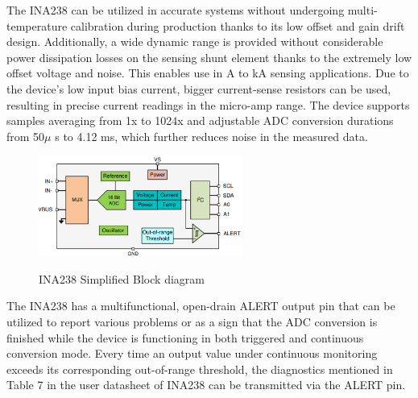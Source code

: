 The INA238 can be utilized in accurate systems without undergoing multi-temperature calibration during production thanks to its low offset and gain drift design. Additionally, a wide dynamic range is provided without considerable power dissipation losses on the sensing shunt element thanks to the extremely low offset voltage and noise. This enables use in A to kA sensing applications. Due to the device's low input bias current, bigger current-sense resistors can be used, resulting in precise current readings in the micro-amp range.
The device supports samples averaging from 1x to 1024x and adjustable ADC conversion durations from 50$\mu$ s to 4.12 ms, which further reduces noise in the measured data.

\begin{figure}[h]
	\centering
	\includegraphics[width=0.6\textwidth]{Chap05/Figures/INA238_Simplified_Block_diagram.PNG}
	\label{fig:INA238_Simplified_Block_diagram}
	\caption{INA238 Simplified Block diagram \cite{INA238_User_Datasheet}}
\end{figure}

The INA238 has a multifunctional, open-drain ALERT output pin that can be utilized to report various problems or as a sign that the ADC conversion is finished while the device is functioning in both triggered and continuous conversion mode. Every time an output value under continuous monitoring exceeds its corresponding out-of-range threshold, the diagnostics mentioned in Table 7 in the user datasheet of INA238 \cite{INA238_User_Datasheet}  can be transmitted via the ALERT pin.


